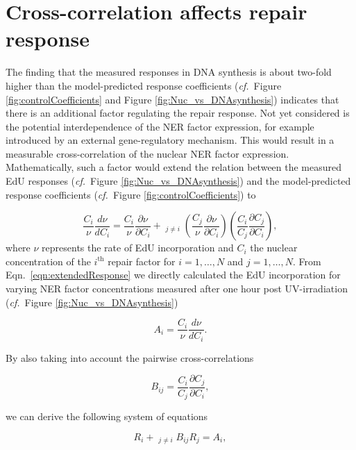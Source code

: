 \section{Cross-correlation affects repair response}
\label{sec:crossCorelResponse}
The finding that the measured responses in DNA synthesis is about two-fold higher than the model-predicted response coefficients (\textit{cf.}\ Figure \ref{fig:controlCoefficients} and Figure \ref{fig:Nuc_vs_DNAsynthesis}) indicates that there is an additional factor regulating the repair response. Not yet considered is the potential interdependence of the NER factor expression, for example introduced by an external gene-regulatory mechanism. This would result in a measurable cross-correlation of the nuclear NER factor expression. Mathematically, such a factor would extend the relation between the measured EdU responses (\textit{cf.}\ Figure \ref{fig:Nuc_vs_DNAsynthesis}) and the model-predicted response coefficients (\textit{cf.}\ Figure \ref{fig:controlCoefficients}) to 

\begin{equation}
\frac{C_i}{\nu}\frac{d \nu}{d C_i} = \frac{C_i}{\nu}\frac{\partial \nu}{\partial C_i} + \mathop{\sum_{j=1}^{N}}_{j \neq i} \left( \frac{C_j}{\nu}\frac{\partial \nu}{\partial C_i}\right) \left(\frac{C_i}{C_j}\frac{\partial C_j}{\partial C_i}\right), 
\label{eqn:extendedResponse}
\end{equation}    
where $\nu$ represents the rate of EdU incorporation and $C_i$ the nuclear concentration of the $i^{\text{th}}$ repair factor for $i = 1,\ldots,N$ and $j = 1,\ldots,N$. From Eqn.\ \ref{eqn:extendedResponse} we directly calculated the EdU incorporation for varying NER factor concentrations measured after one hour post UV-irradiation (\textit{cf.}\ Figure \ref{fig:Nuc_vs_DNAsynthesis})

\begin{equation}
A_i = \frac{C_i}{\nu}\frac{d \nu}{d C_i}. \nonumber
\end{equation}

By also taking into account the pairwise cross-correlations

\begin{equation}
B_{ij} = \frac{C_i}{C_j}\frac{\partial C_j}{\partial C_i}, \nonumber
\end{equation}

we can derive the following system of equations


\begin{equation}
R_i + \mathop{\sum_{j = 1}^{N}}_{j\neq i} B_{ij}R_j = A_i,
\label{eqn:linearEqnSystem}
\end{equation}

